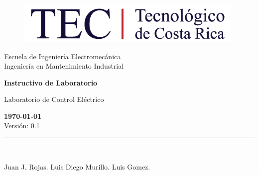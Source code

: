 \documentclass[12pt,letterpaper]{report}
\newcommand{\escuela}{Escuela de Ingeniería Electromecánica}
\newcommand{\programa}{Ingeniería en Mantenimiento Industrial}
\newcommand{\curso}{Laboratorio de Control Eléctrico}
\begin{document}
\begin{titlepage}

\begin{center}
\vspace*{1in}
\begin{figure}[htb]
\begin{center}
\includegraphics[width=11cm]{fig/logo.png}
\end{center}
\end{figure}
\vspace*{0.4in}
\begin{Large}
\escuela\\
\vspace*{0.15in}
\programa\\
\vspace*{0.8in}
\end{Large}
\vspace*{0.2in}
\begin{Large}
\textbf{Instructivo de Laboratorio} \\
\end{Large}
\vspace*{0.3in}
\begin{large}
\curso\\
\end{large}
\vspace*{2.5in}
\begin{Large}
\textbf{\today}\\
Versión: 0.1\\
\end{Large}
\rule{80mm}{0.1mm}\\
\vspace*{0.1in}
\begin{large}
Juan J. Rojas. Luis Diego Murillo. Luis Gomez.\\
\end{large}
\end{center}

\end{titlepage}

\tableofcontents



%


\appendix







\end{document}

